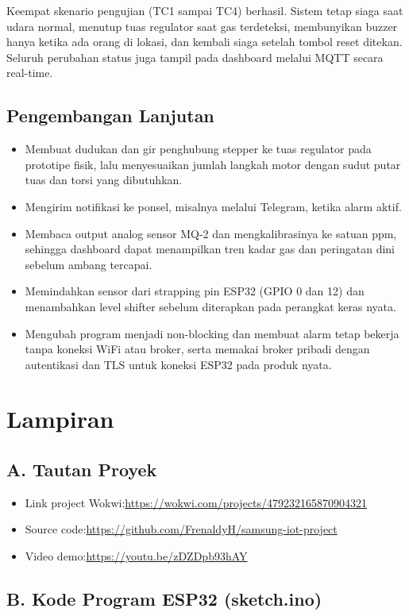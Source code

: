 \documentclass[12pt,a4paper,oneside]{report}
\begin{document}
Keempat skenario pengujian (TC1 sampai TC4) berhasil. Sistem tetap siaga saat udara normal, menutup tuas regulator saat gas terdeteksi, membunyikan buzzer hanya ketika ada orang di lokasi, dan kembali siaga setelah tombol reset ditekan. Seluruh perubahan status juga tampil pada dashboard melalui MQTT secara real-time.

\section{Pengembangan Lanjutan}
\begin{itemize}
  \item Membuat dudukan dan gir penghubung stepper ke tuas regulator pada prototipe fisik, lalu menyesuaikan jumlah langkah motor dengan sudut putar tuas dan torsi yang dibutuhkan.
  \item Mengirim notifikasi ke ponsel, misalnya melalui Telegram, ketika alarm aktif.
  \item Membaca output analog sensor MQ-2 dan mengkalibrasinya ke satuan ppm, sehingga dashboard dapat menampilkan tren kadar gas dan peringatan dini sebelum ambang tercapai.
  \item Memindahkan sensor dari strapping pin ESP32 (GPIO 0 dan 12) dan menambahkan level shifter sebelum diterapkan pada perangkat keras nyata.
  \item Mengubah program menjadi non-blocking dan membuat alarm tetap bekerja tanpa koneksi WiFi atau broker, serta memakai broker pribadi dengan autentikasi dan TLS untuk koneksi ESP32 pada produk nyata.
\end{itemize}

\chapter*{Lampiran}

\section*{A. Tautan Proyek}
\begin{itemize}
  \item Link project Wokwi:\newline \url{https://wokwi.com/projects/479232165870904321}
  \item Source code:\newline \url{https://github.com/FrenaldyH/samsung-iot-project}
  \item Video demo:\newline \url{https://youtu.be/zDZDpb93hAY}
\end{itemize}

\section*{B. Kode Program ESP32 (sketch.ino)}

\end{document}
